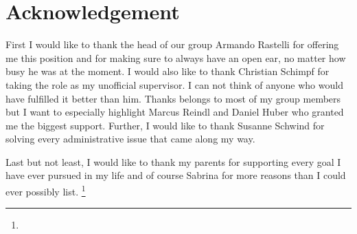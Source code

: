 \chapter*{Acknowledgement}
\label{cha:acknowledgment}

First I would like to thank the head of our group Armando Rastelli for offering me this position and for making sure to always have an open ear, no matter how busy he was at the moment.
I would also like to thank Christian Schimpf for taking the role as my unofficial supervisor.
I can not think of anyone who would have fulfilled it better than him.
Thanks belongs to most of my group members but I want to especially highlight Marcus Reindl and Daniel Huber who granted me the biggest support. 
Further, I would like to thank Susanne Schwind for solving every administrative issue that came along my way.

Last but not least, I would like to thank my parents for supporting every goal I have ever pursued in my life and of course Sabrina for more reasons than I could ever possibly list.
\footnote{\mycolophon}